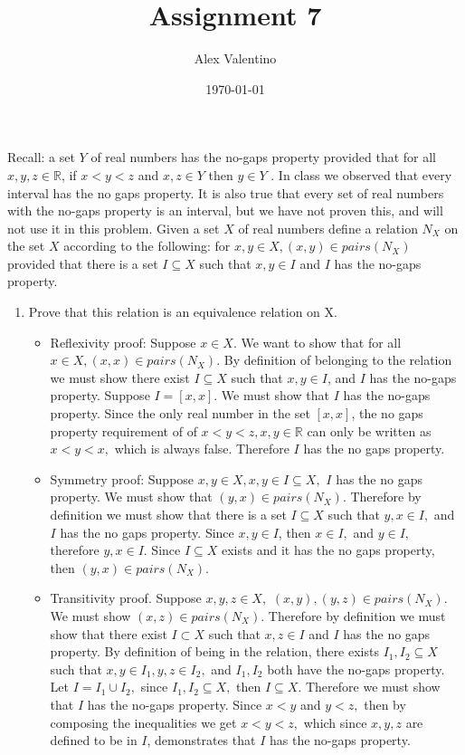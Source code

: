 \documentclass[12pt, letterpaper]{article}
\date{\today}
\author{Alex Valentino}
\title{Assignment 7}
\newcommand{\R}{\mathbb{R}}
\begin{document}
	Recall: a set $Y$ of real numbers has the no-gaps property provided
that for all $x, y, z \in \R$, if $x < y < z$ and $x, z \in Y$ then $y \in Y$ . In class we observed that
every interval has the no gaps property. It is also true that every set of real numbers with
the no-gaps property is an interval, but we have not proven this, and will not use it in this
problem.
Given a set $X$ of real numbers define a relation $N_X$ on the set $X$ according to the following:
for $x, y \in X, (x, y) \in pairs(N_X )$ provided that there is a set $I \subseteq X$ such that $x, y \in I$ and $I$
has the no-gaps property.
\begin{enumerate}
	\item Prove that this relation is an equivalence relation on X.
	\begin{itemize}
		\item Reflexivity proof: Suppose $x \in X.$  We want to show that for all $x \in X, (x,x) \in pairs(N_X).$  By definition of belonging to the relation we must show there exist $I \subseteq X$ such that $x,y \in I$, and $I$ has the no-gaps property.  Suppose $I = [x,x]$.  We must show that $I$ has the no-gaps property.  Since the only real number in the set $[x,x]$, the no gaps property requirement of of $x < y < z, x,y \in \R$ can only be written as $x < y < x,$ which is always false.  Therefore $I$ has the no gaps property.        
		\item Symmetry proof:  Suppose $x,y \in X, x,y \in I \subseteq X, $ $I$ has the no gaps property.  We must show that $(y,x) \in pairs(N_X).$  Therefore by definition we must show that there is a set $I \subseteq X$ such that $y,x \in I,$ and $I$ has the no gaps property.  Since $x,y \in I$, then $x \in I,$ and $y \in I,$ therefore $y,x \in I.$  Since $I\subseteq X$ exists and it has the no gaps property, then $(y,x) \in pairs(N_X).$   
		\item Transitivity proof.  Suppose $x,y,z \in X,$ $(x,y), (y,z) \in pairs(N_X).$  We must show $(x,z) \in pairs(N_X).$  Therefore by definition we must show that there exist $I \subset X$ such that $x,z \in I$ and $I$ has the no gaps property.  By definition of being in the relation, there exists $I_1, I_2 \subseteq X$ such that $x,y \in I_1, y,z \in I_2,$ and $I_1,I_2$ both have the no-gaps property.  Let $I = I_1 \cup I_2,$ since $I_1, I_2 \subseteq X,$ then $I \subseteq X.$  Therefore we must show that $I$ has the no-gaps property.  Since $x < y$ and $y < z,$ then by composing the inequalities we get $x<y<z,$ which since $x,y,z$ are defined to be in $I$, demonstrates that $I$ has the no-gaps property.        

\end{itemize}
\end{enumerate}
\end{document}
